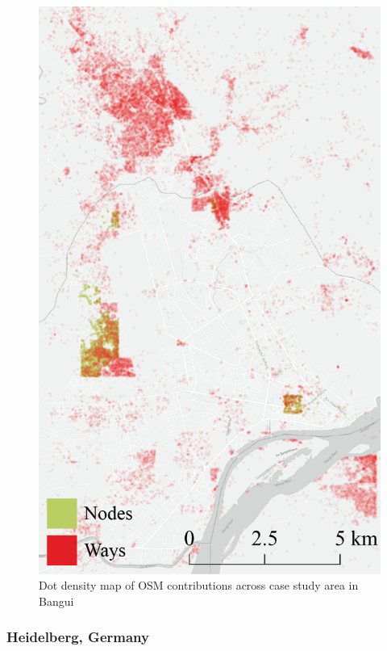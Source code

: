 \begin{figure}
    \centering 
    \includegraphics[width = \textwidth]{Images/ban_map.png}
    \caption[Bangui dot density map]{Dot density map of OSM contributions across case study area in Bangui} 
    \label{fig:car} 
\end{figure}

\subsubsection{Heidelberg, Germany}


